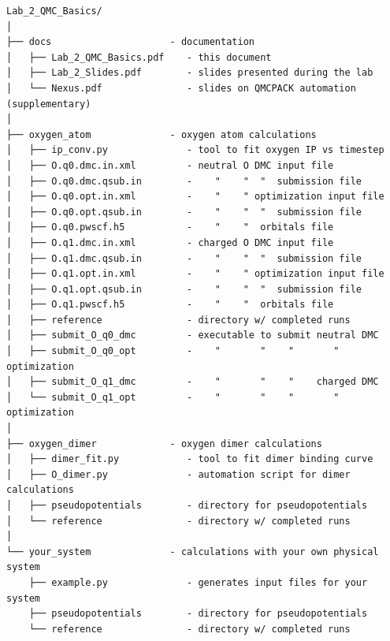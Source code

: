 \begin{shaded}
\begin{verbatim}
Lab_2_QMC_Basics/
│
├── docs                     - documentation 
│   ├── Lab_2_QMC_Basics.pdf    - this document
│   ├── Lab_2_Slides.pdf        - slides presented during the lab
│   └── Nexus.pdf               - slides on QMCPACK automation (supplementary)
│
├── oxygen_atom              - oxygen atom calculations 
│   ├── ip_conv.py              - tool to fit oxygen IP vs timestep
│   ├── O.q0.dmc.in.xml         - neutral O DMC input file
│   ├── O.q0.dmc.qsub.in        -    "    "  "  submission file
│   ├── O.q0.opt.in.xml         -    "    " optimization input file
│   ├── O.q0.opt.qsub.in        -    "    "  "  submission file         
│   ├── O.q0.pwscf.h5           -    "    "  orbitals file         
│   ├── O.q1.dmc.in.xml         - charged O DMC input file         
│   ├── O.q1.dmc.qsub.in        -    "    "  "  submission file   
│   ├── O.q1.opt.in.xml         -    "    " optimization input file
│   ├── O.q1.opt.qsub.in        -    "    "  "  submission file   
│   ├── O.q1.pwscf.h5           -    "    "  orbitals file         
│   ├── reference               - directory w/ completed runs
│   ├── submit_O_q0_dmc         - executable to submit neutral DMC
│   ├── submit_O_q0_opt         -    "       "    "       "    optimization
│   ├── submit_O_q1_dmc         -    "       "    "    charged DMC
│   └── submit_O_q1_opt         -    "       "    "       "    optimization
│
├── oxygen_dimer             - oxygen dimer calculations
│   ├── dimer_fit.py            - tool to fit dimer binding curve
│   ├── O_dimer.py              - automation script for dimer calculations
│   ├── pseudopotentials        - directory for pseudopotentials
│   └── reference               - directory w/ completed runs
│
└── your_system              - calculations with your own physical system
    ├── example.py              - generates input files for your system
    ├── pseudopotentials        - directory for pseudopotentials
    └── reference               - directory w/ completed runs
\end{verbatim}
\end{shaded}





